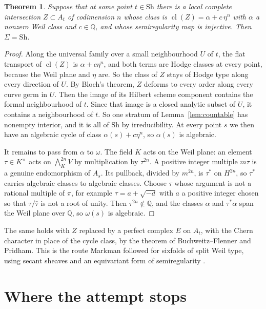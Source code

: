 \documentclass[11pt]{amsart}
\newtheorem{theorem}{Theorem}
\theoremstyle{definition}
\theoremstyle{remark}
\newcommand{\QQ}{\mathbb{Q}}
\newcommand{\Sh}{\mathrm{Sh}}
\newcommand{\cl}{\operatorname{cl}}
\begin{document}
\begin{theorem}\label{thm:semireg}
Suppose that at some point $t\in\Sh$ there is a local complete intersection
$Z\subset A_{t}$ of codimension $n$ whose class is
$\cl(Z)=\alpha+c\,\eta^{n}$ with $\alpha$ a nonzero Weil class and
$c\in\QQ$, and whose semiregularity map is injective. Then $\Sigma=\Sh$.
\end{theorem}

\begin{proof}
Along the universal family over a small neighbourhood $U$ of $t$, the flat
transport of $\cl(Z)$ is $\alpha+c\eta^{n}$, and both terms are Hodge
classes at every point, because the Weil plane and $\eta$ are. So the class
of $Z$ stays of Hodge type along every direction of $U$. By Bloch's theorem,
$Z$ deforms to every order along every curve germ in $U$. Then the image of
its Hilbert scheme component contains the formal neighbourhood of $t$. Since
that image is a closed analytic subset of $U$, it contains a neighbourhood
of $t$. So one stratum of Lemma~\ref{lem:countable} has nonempty interior,
and it is all of $\Sh$ by irreducibility. At every point $s$ we then have an
algebraic cycle of class $\alpha(s)+c\eta^{n}$, so $\alpha(s)$ is
algebraic.

It remains to pass from $\alpha$ to $\omega$. The field $K$ acts on the
Weil plane: an element $\tau\in K^{\times}$ acts on $\bigwedge^{2n}_{K}V$ by
multiplication by $\tau^{2n}$. A positive integer multiple $m\tau$ is a
genuine endomorphism of $A_{s}$. Its pullback, divided by $m^{2n}$, is
$\tau^{*}$ on $H^{2n}$, so $\tau^{*}$ carries algebraic classes to
algebraic classes. Choose $\tau$ whose argument is not a rational multiple of $\pi$, for
example $\tau=a+\sqrt{-d}$ with $a$ a positive integer chosen so that
$\tau/\bar\tau$ is not a root of unity. Then $\tau^{2n}\notin\QQ$, and the classes
$\alpha$ and $\tau^{*}\alpha$ span the Weil plane over $\QQ$, so $\omega(s)$
is algebraic.
\end{proof}

The same holds with $Z$ replaced by a perfect complex $E$ on $A_{t}$, with
the Chern character in place of the cycle class, by the theorem of
Buchweitz--Flenner and Pridham. This is the route Markman followed for
sixfolds of split Weil type, using secant sheaves and an equivariant form
of semiregularity \cite{Mar25b}.

\section{Where the attempt stops}\label{sec:stops}
\end{document}
